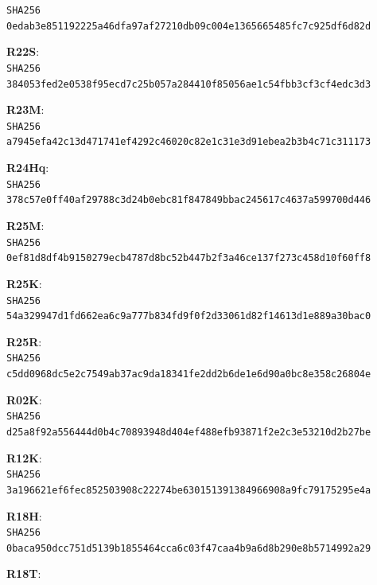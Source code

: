 \documentclass[11pt,a4paper]{article}
\begin{document}
\texttt{SHA256 0edab3e851192225a46dfa97af27210d\allowbreak b09c004e1365665485fc7c925df6d82d}\par\medskip
\textbf{R22S}: \\
\texttt{SHA256 384053fed2e0538f95ecd7c25b057a28\allowbreak 4410f85056ae1c54fbb3cf3cf4edc3d3}\par\medskip
\textbf{R23M}: \\
\texttt{SHA256 a7945efa42c13d471741ef4292c46020\allowbreak c82e1c31e3d91ebea2b3b4c71c311173}\par\medskip
\textbf{R24Hq}: \\
\texttt{SHA256 378c57e0ff40af29788c3d24b0ebc81f\allowbreak 847849bbac245617c4637a599700d446}\par\medskip
\textbf{R25M}: \\
\texttt{SHA256 0ef81d8df4b9150279ecb4787d8bc52b\allowbreak 447b2f3a46ce137f273c458d10f60ff8}\par\medskip
\textbf{R25K}: \\
\texttt{SHA256 54a329947d1fd662ea6c9a777b834fd9\allowbreak f0f2d33061d82f14613d1e889a30bac0}\par\medskip
\textbf{R25R}: \\
\texttt{SHA256 c5dd0968dc5e2c7549ab37ac9da18341\allowbreak fe2dd2b6de1e6d90a0bc8e358c26804e}\par\medskip
\textbf{R02K}: \\
\texttt{SHA256 d25a8f92a556444d0b4c70893948d404\allowbreak ef488efb93871f2e2c3e53210d2b27be}\par\medskip
\textbf{R12K}: \\
\texttt{SHA256 3a196621ef6fec852503908c22274be6\allowbreak 30151391384966908a9fc79175295e4a}\par\medskip
\textbf{R18H}: \\
\texttt{SHA256 0baca950dcc751d5139b1855464cca6c\allowbreak 03f47caa4b9a6d8b290e8b5714992a29}\par\medskip
\textbf{R18T}: \\
\end{document}
